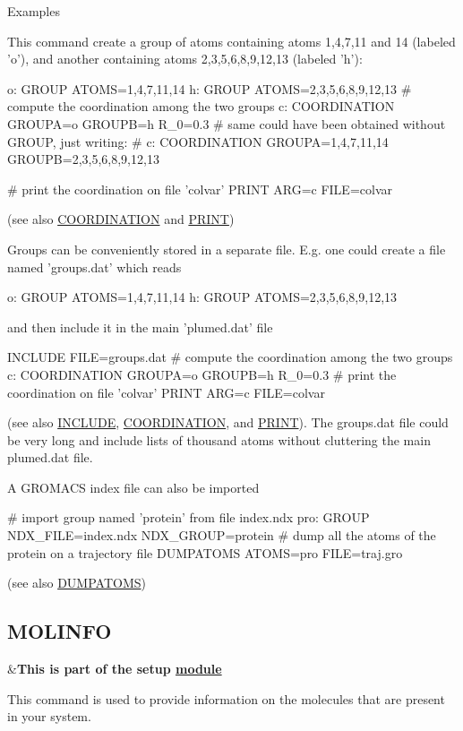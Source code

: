 \begin{DoxyParagraph}{Examples}

\end{DoxyParagraph}
This command create a group of atoms containing atoms 1,4,7,11 and 14 (labeled 'o'), and another containing atoms 2,3,5,6,8,9,12,13 (labeled 'h')\+: \begin{DoxyVerb}o: GROUP ATOMS=1,4,7,11,14
h: GROUP ATOMS=2,3,5,6,8,9,12,13
# compute the coordination among the two groups
c: COORDINATION GROUPA=o GROUPB=h R_0=0.3
# same could have been obtained without GROUP, just writing:
# c: COORDINATION GROUPA=1,4,7,11,14 GROUPB=2,3,5,6,8,9,12,13

# print the coordination on file 'colvar'
PRINT ARG=c FILE=colvar
\end{DoxyVerb}
 (see also \hyperlink{COORDINATION}{C\+O\+O\+R\+D\+I\+N\+A\+T\+I\+O\+N} and \hyperlink{PRINT}{P\+R\+I\+N\+T})

Groups can be conveniently stored in a separate file. E.\+g. one could create a file named 'groups.\+dat' which reads \begin{DoxyVerb}o: GROUP ATOMS=1,4,7,11,14
h: GROUP ATOMS=2,3,5,6,8,9,12,13
\end{DoxyVerb}
 and then include it in the main 'plumed.\+dat' file \begin{DoxyVerb}INCLUDE FILE=groups.dat
# compute the coordination among the two groups
c: COORDINATION GROUPA=o GROUPB=h R_0=0.3
# print the coordination on file 'colvar'
PRINT ARG=c FILE=colvar
\end{DoxyVerb}
 (see also \hyperlink{INCLUDE}{I\+N\+C\+L\+U\+D\+E}, \hyperlink{COORDINATION}{C\+O\+O\+R\+D\+I\+N\+A\+T\+I\+O\+N}, and \hyperlink{PRINT}{P\+R\+I\+N\+T}). The groups.\+dat file could be very long and include lists of thousand atoms without cluttering the main plumed.\+dat file.

A G\+R\+O\+M\+A\+C\+S index file can also be imported \begin{DoxyVerb}# import group named 'protein' from file index.ndx
pro: GROUP NDX_FILE=index.ndx NDX_GROUP=protein
# dump all the atoms of the protein on a trajectory file
DUMPATOMS ATOMS=pro FILE=traj.gro
\end{DoxyVerb}
 (see also \hyperlink{DUMPATOMS}{D\+U\+M\+P\+A\+T\+O\+M\+S}) \hypertarget{MOLINFO}{}\subsection{M\+O\+L\+I\+N\+F\+O}\label{MOLINFO}
\begin{TabularC}{2}
\hline
&{\bfseries  This is part of the setup \hyperlink{mymodules}{module }}   \\
\end{TabularC}
This command is used to provide information on the molecules that are present in your system.

